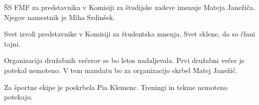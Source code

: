 \documentclass{seja}
\begin{document}
\begin{ad}
	\begin{sklep*}
		ŠS FMF za predstavnika v Komisiji za študijske zadeve imenuje Mateja Janežiča. Njegov namestnik je Miha Srdinšek.
	\end{sklep*}

	\begin{sklep*}
		Svet izvoli predstavnike v Komisiji za študentska mnenja.
		Svet sklene, da so člani tajni.
	\end{sklep*}

	\item
	Organizacija družabnih večerov se bo letos nadaljevala. Prvi družabni večer je potekal nemoteno. V tem mandatu bo za organizacijo skrbel Matej Janežič.

	Za športne ekipe je poskrbela Pia Klemenc. Treningi in tekme nemoteno potekajo.
\end{ad}

\makeatletter \global\let\@enddocumenthook\@empty \makeatother
{}
\end{document}
